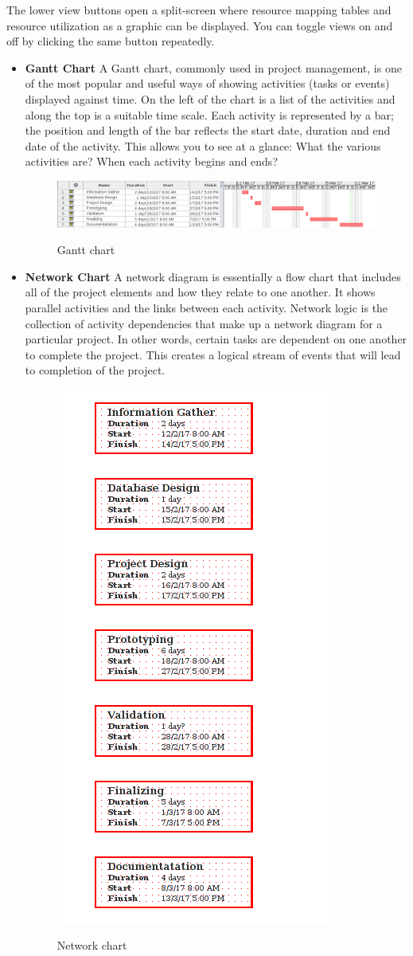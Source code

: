 The lower view buttons open a split-screen where resource mapping tables and resource utilization as a graphic can be displayed. You can toggle views on and off by clicking the same button repeatedly.
\begin{itemize}
\item \textbf{Gantt Chart }
A Gantt chart, commonly used in project management, is one of the most popular and useful ways of showing activities (tasks or events) displayed against time. On the left of the chart is a list of the activities and along the top is a suitable time scale. Each activity is represented by a bar; the position and length of the bar reflects the start date, duration and end date of the activity. This allows you to see at a glance: 
What the various activities are?
When each activity begins and ends?
\begin{figure}[!ht]
\centering
\includegraphics[width=1\linewidth]{input/images/img1.png}
\label{fig:image1}
\caption{Gantt chart}
\end{figure}

\item\textbf{ Network Chart}
A network diagram is essentially a flow chart that includes all of the project elements and how they relate to one another. It shows parallel activities and the links between each activity. Network logic is the collection of activity dependencies that make up a network diagram for a particular project. In other words, certain tasks are dependent on one another to complete the project. This creates a logical stream of events that will lead to completion of the project.

\begin{figure}[!ht]
\centering
\includegraphics[width=0.3\linewidth]{input/images/img2.png}
\label{fig:image1}
\caption{Network chart}
\end{figure}


\end{itemize}
